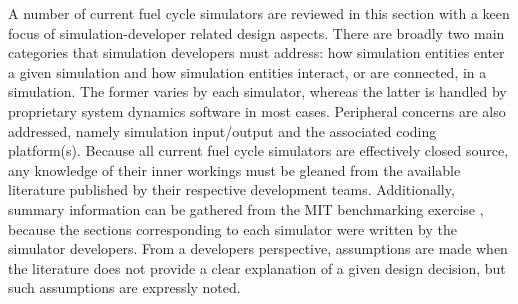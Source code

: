 A number of current fuel cycle simulators are reviewed in this section with a
keen focus of simulation-developer related design aspects. There are broadly two
main categories that simulation developers must address: how simulation entities
enter a given simulation and how simulation entities interact, or are connected,
in a simulation. The former varies by each simulator, whereas the latter is
handled by proprietary system dynamics software in most cases. Peripheral
concerns are also addressed, namely simulation input/output and the associated
coding platform(s). Because all current fuel cycle simulators are effectively
closed source, any knowledge of their inner workings must be gleaned from the
available literature published by their respective development
teams. Additionally, summary information can be gathered from the MIT
benchmarking exercise \cite{guerin_benchmark_2009}, because the sections
corresponding to each simulator were written by the simulator developers. From a
developers perspective, assumptions are made when the literature does not
provide a clear explanation of a given design decision, but such assumptions are
expressly noted.
